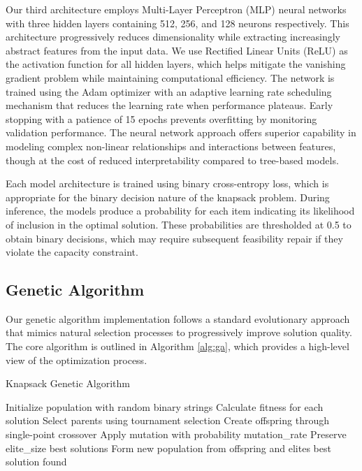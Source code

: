 \documentclass[conference, a4paper]{IEEEtran}
\begin{document}
Our third architecture employs Multi-Layer Perceptron (MLP) neural networks with three hidden layers containing 512, 256, and 128 neurons respectively. This architecture progressively reduces dimensionality while extracting increasingly abstract features from the input data. We use Rectified Linear Units (ReLU) as the activation function for all hidden layers, which helps mitigate the vanishing gradient problem while maintaining computational efficiency. The network is trained using the Adam optimizer with an adaptive learning rate scheduling mechanism that reduces the learning rate when performance plateaus. Early stopping with a patience of 15 epochs prevents overfitting by monitoring validation performance. The neural network approach offers superior capability in modeling complex non-linear relationships and interactions between features, though at the cost of reduced interpretability compared to tree-based models.

Each model architecture is trained using binary cross-entropy loss, which is appropriate for the binary decision nature of the knapsack problem. During inference, the models produce a probability for each item indicating its likelihood of inclusion in the optimal solution. These probabilities are thresholded at 0.5 to obtain binary decisions, which may require subsequent feasibility repair if they violate the capacity constraint.

\subsection{Genetic Algorithm}
Our genetic algorithm implementation follows a standard evolutionary approach that mimics natural selection processes to progressively improve solution quality. The core algorithm is outlined in Algorithm \ref{alg:ga}, which provides a high-level view of the optimization process.

\begin{algorithm}
\caption{Knapsack Genetic Algorithm}
\label{alg:ga}
\begin{algorithmic}[1]
    \State Initialize population with random binary strings
        \State Calculate fitness for each solution
        \State Select parents using tournament selection
        \State Create offspring through single-point crossover
        \State Apply mutation with probability mutation\_rate
        \State Preserve elite\_size best solutions
        \State Form new population from offspring and elites
    \EndFor
    \State \Return best solution found
\EndProcedure
\end{algorithmic}
\end{algorithm}
\end{document}
